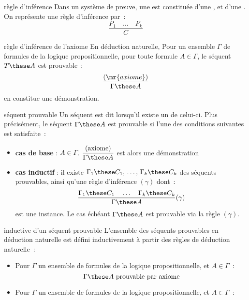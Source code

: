 \begin{definition}{7.4}{règle d'inférence}
    Dans un système de preuve, une  est constituée d'une , et d'une . On représente une règle d'inférence par~:
    $$\frac{P_1 \quad \dots \quad P_k}{C}$$
\end{definition}

\begin{definition}{7.5}{règle d'inférence de l'axiome}
    En déduction naturelle, Pour un ensemble $\Gamma$ de formules de la logique propositionnelle, pour toute formule $A \in \Gamma$, le séquent $T \these A$ est prouvable~:
    $$\frac{(\mr{axiome})}{\Gamma \these A}$$
    en constitue une démonstration.
\end{definition}

\begin{definition}{7.6}{séquent prouvable}
    Un séquent est dit  lorsqu'il existe un  de celui-ci. Plus précisément, le séquent $\Gamma \these A$ est prouvable si l'une des conditions suivantes est satisfaite~:
    \begin{itemize}
        \item \textbf{cas de base} : $A \in \Gamma$. $\displaystyle \frac{(\text{axiome})}{\Gamma \these A}$ est alors une démonstration
        \item \textbf{cas inductif} : il existe $\Gamma_1 \these C_1,\, \dots,\,  \Gamma_k \these C_k$ des séquents prouvables, ainsi qu'une règle d'inférence $(\gamma)$ dont~:
        $$\frac{\Gamma_1 \these C_1 \quad \dots \quad \Gamma_k \these C_k}{\Gamma \these A}(\gamma)$$
        est une instance. Le cas échéant $\Gamma \these A$ est prouvable via la règle $(\gamma)$.
    \end{itemize}
\end{definition}

\begin{definition}{7.7}{inductive d'un séquent prouvable}
    L'ensemble des séquents prouvables en déduction naturelle est défini inductivement à partir des règles de déduction naturelle~:
    \begin{itemize}
        \item Pour $\Gamma$ un ensemble de formules de la logique propositionnelle, et $A \in \Gamma$~:
        $$\Gamma \these A \text{ prouvable par axiome}$$
        \item Pour $\Gamma$ un ensemble de formules de la logique propositionnelle, et $A \in \Gamma$~:

    \end{itemize}
\end{definition}

